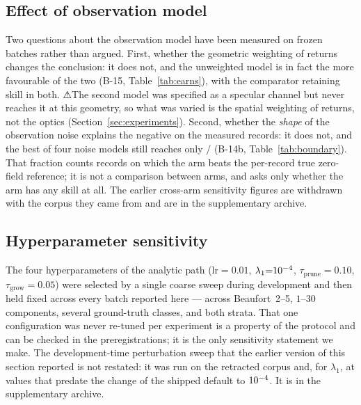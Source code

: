 \documentclass[review]{elsarticle}
\begin{document}
\subsection{Effect of observation model}

Two questions about the observation model have been measured on frozen batches
rather than argued. First, whether the geometric weighting of returns changes the
conclusion: it does not, and the unweighted model is in fact the more favourable of
the two (B-15, Table~\ref{tab:earns}), with the comparator retaining skill in both.
⚠The second model was specified as a specular channel but never reaches it at this
geometry, so what was varied is the spatial weighting of returns, not the optics
(Section~\ref{sec:experiments}). Second, whether the \emph{shape} of the observation
noise explains the negative on the measured records: it does not, and the best of
four noise models still reaches only \BFourteenBBeats{}/\BFourteenBN{}
(B-14b, Table~\ref{tab:boundary}). That fraction counts records on which the arm
beats the per-record true zero-field reference; it is not a comparison between arms,
and asks only whether the arm has any skill at all. The earlier cross-arm sensitivity figures are
withdrawn with the corpus they came from and are in the supplementary archive.
\subsection{Hyperparameter sensitivity}
\label{sec:hyper}

The four hyperparameters of the analytic path ($\text{lr}{=}0.01$,
$\lambda_1{=}10^{-4}{}$, $\tau_{\text{prune}}{=}0.10$,
$\tau_{\text{grow}}{=}0.05$) were selected by a single coarse sweep during
development and then held fixed across every batch reported here --- across
Beaufort~2--5, $1$--$30$ components, several ground-truth classes, and both
strata. That one configuration was never re-tuned per experiment is a property of
the protocol and can be checked in the preregistrations; it is the only
sensitivity statement we make. The development-time perturbation sweep that the
earlier version of this section reported is not restated: it was run on the
retracted corpus and, for $\lambda_1$, at values that predate the change of the
shipped default to $10^{-4}{}$. It is in the supplementary archive.
\end{document}
